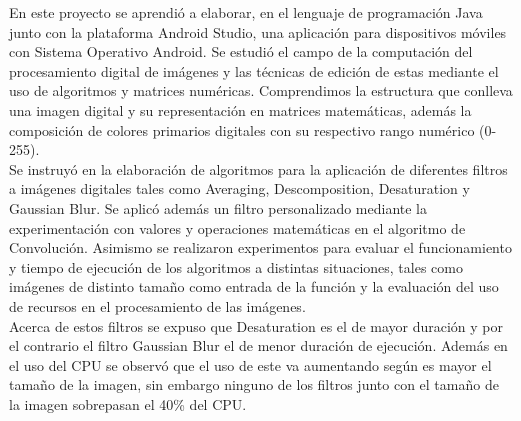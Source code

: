 \documentclass[journal]{IEEEtran}
\begin{document}
 En este proyecto se aprendió a elaborar, en el lenguaje de programación Java junto con la plataforma Android Studio, una aplicación para dispositivos móviles con Sistema Operativo Android. Se estudió el campo de la computación del procesamiento digital de imágenes y las técnicas de edición de estas mediante el uso de algoritmos y matrices numéricas. Comprendimos la estructura que conlleva una imagen digital y su representación en matrices matemáticas, además la composición de colores primarios digitales con su respectivo rango numérico (0-255). \\
Se instruyó en la elaboración de algoritmos para la aplicación de diferentes filtros a imágenes digitales tales como Averaging, Descomposition, Desaturation y Gaussian Blur. Se aplicó además un filtro personalizado mediante la experimentación con valores y operaciones matemáticas en el algoritmo de Convolución. Asimismo se realizaron experimentos para evaluar el funcionamiento y tiempo de ejecución de los algoritmos a distintas situaciones, tales como imágenes de distinto tamaño como entrada de la función y la evaluación del uso de recursos en el procesamiento de las imágenes. \\
Acerca de estos filtros se expuso que Desaturation es el de mayor duración y por el contrario el filtro Gaussian Blur el de menor duración de ejecución. Además en el uso del CPU se observó que el uso de este va aumentando según es mayor el tamaño de la imagen, sin embargo ninguno de los filtros junto con el tamaño de la imagen sobrepasan el 40\% del CPU.
\end{document}
